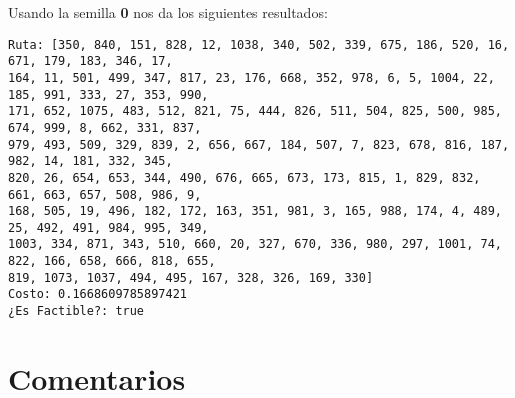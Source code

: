 \documentclass{article}
\begin{document}
Usando la semilla \textbf{0} nos da los siguientes resultados:
\begin{verbatim}
Ruta: [350, 840, 151, 828, 12, 1038, 340, 502, 339, 675, 186, 520, 16, 671, 179, 183, 346, 17,
164, 11, 501, 499, 347, 817, 23, 176, 668, 352, 978, 6, 5, 1004, 22, 185, 991, 333, 27, 353, 990,
171, 652, 1075, 483, 512, 821, 75, 444, 826, 511, 504, 825, 500, 985, 674, 999, 8, 662, 331, 837,
979, 493, 509, 329, 839, 2, 656, 667, 184, 507, 7, 823, 678, 816, 187, 982, 14, 181, 332, 345,
820, 26, 654, 653, 344, 490, 676, 665, 673, 173, 815, 1, 829, 832, 661, 663, 657, 508, 986, 9,
168, 505, 19, 496, 182, 172, 163, 351, 981, 3, 165, 988, 174, 4, 489, 25, 492, 491, 984, 995, 349,
1003, 334, 871, 343, 510, 660, 20, 327, 670, 336, 980, 297, 1001, 74, 822, 166, 658, 666, 818, 655,
819, 1073, 1037, 494, 495, 167, 328, 326, 169, 330]
Costo: 0.1668609785897421
¿Es Factible?: true
\end{verbatim}


\section{Comentarios}
\end{document}

